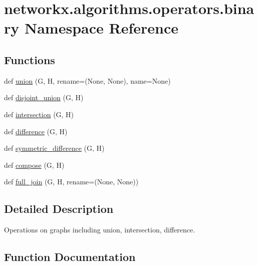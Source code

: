 \hypertarget{namespacenetworkx_1_1algorithms_1_1operators_1_1binary}{}\section{networkx.\+algorithms.\+operators.\+binary Namespace Reference}
\label{namespacenetworkx_1_1algorithms_1_1operators_1_1binary}
\subsection*{Functions}
\begin{DoxyCompactItemize}
\item 
def \hyperlink{namespacenetworkx_1_1algorithms_1_1operators_1_1binary_a50ec19daf9362376b5b30a6cecd15332}{union} (G, H, rename=(None, None), name=None)
\item 
def \hyperlink{namespacenetworkx_1_1algorithms_1_1operators_1_1binary_a24a3e1feb5877673d0f4398390ee0827}{disjoint\+\_\+union} (G, H)
\item 
def \hyperlink{namespacenetworkx_1_1algorithms_1_1operators_1_1binary_adbc0da1f63a3b76f5180a315493b2045}{intersection} (G, H)
\item 
def \hyperlink{namespacenetworkx_1_1algorithms_1_1operators_1_1binary_a7f1344a1a58fd6b4c9b548ec21696106}{difference} (G, H)
\item 
def \hyperlink{namespacenetworkx_1_1algorithms_1_1operators_1_1binary_a5e3003e6b8541bbe1ee2b7ef1339a490}{symmetric\+\_\+difference} (G, H)
\item 
def \hyperlink{namespacenetworkx_1_1algorithms_1_1operators_1_1binary_aac06181fb38342d26d2425f250de7320}{compose} (G, H)
\item 
def \hyperlink{namespacenetworkx_1_1algorithms_1_1operators_1_1binary_a4ccd668d718078b0f4578e55274e590f}{full\+\_\+join} (G, H, rename=(None, None))
\end{DoxyCompactItemize}


\subsection{Detailed Description}
\begin{DoxyVerb}Operations on graphs including union, intersection, difference.
\end{DoxyVerb}
 

\subsection{Function Documentation}
\mbox{\label{namespacenetworkx_1_1algorithms_1_1operators_1_1binary_aac06181fb38342d26d2425f250de7320}} 
